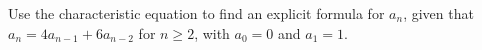 Use the characteristic equation to find an explicit formula for $a_n$, given that $a_n=4a_{n-1}+6a_{n-2}$ for $n\ge2$, with $a_0=0$ and $a_1=1$.
